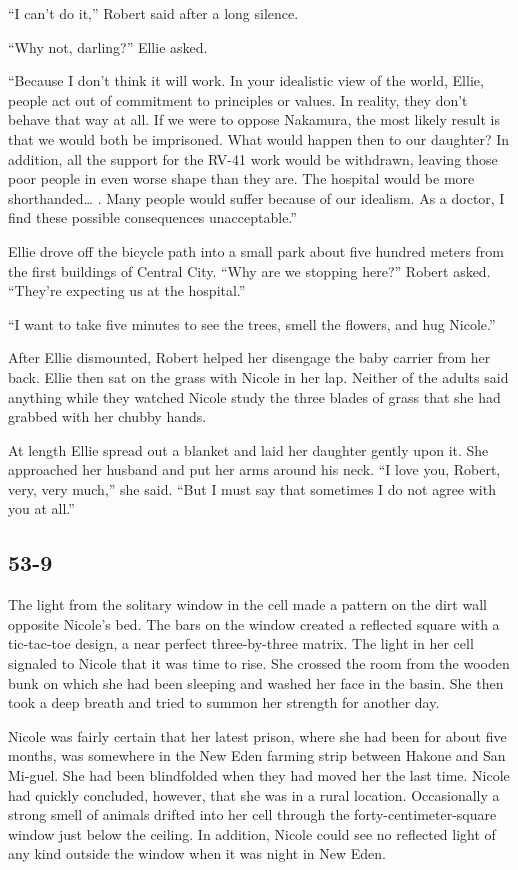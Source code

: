 \documentclass[]{article}
\begin{document}
{{“I can’t do it,” Robert said after a long silence.

“Why not, darling?” Ellie asked.

“Because I don’t think it will work.  In your idealistic view of the world, Ellie, people act out of commitment to principles or values.  In reality, they don’t behave that way at all.  If we were to oppose Nakamura, the most likely result is that we would both be imprisoned.  What would happen then to our daughter? In addition, all the support for the RV-41 work would be withdrawn, leaving those poor people in even worse shape than they are.  The hospital would be more shorthanded… .  Many people would suffer because of our idealism.  As a doctor, I find these possible consequences unacceptable.”

Ellie drove off the bicycle path into a small park about five hundred meters from the first buildings of Central City.  “Why are we stopping here?” Robert asked.  “They’re expecting us at the hospital.”

“I want to take five minutes to see the trees, smell the flowers, and hug Nicole.”

After Ellie dismounted, Robert helped her disengage the baby carrier from her back.  Ellie then sat on the grass with Nicole in her lap.  Neither of the adults said anything while they watched Nicole study the three blades of grass that she had grabbed with her chubby hands.

At length Ellie spread out a blanket and laid her daughter gently upon it.  She approached her husband and put her arms around his neck.  “I love you, Robert, very, very much,” she said.  “But I must say that sometimes I do not agree with you at all.”


\subsection*{53-9}

The light from the solitary window in the cell made a pattern on the dirt wall opposite Nicole’s bed.  The bars on the window created a reflected square with a tic-tac-toe design, a near perfect three-by-three matrix.  The light in her cell signaled to Nicole that it was time to rise.  She crossed the room from the wooden bunk on which she had been sleeping and washed her face in the basin.  She then took a deep breath and tried to summon her strength for another day.

Nicole was fairly certain that her latest prison, where she had been for about five months, was somewhere in the New Eden farming strip between Hakone and San Mi-guel.  She had been blindfolded when they had moved her the last time.  Nicole had quickly concluded, however, that she was in a rural location.  Occasionally a strong smell of animals drifted into her cell through the forty-centimeter-square window just below the ceiling.  In addition, Nicole could see no reflected light of any kind outside the window when it was night in New Eden.

}}
\end{document}
